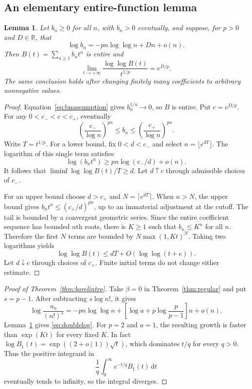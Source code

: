 \documentclass[11pt,a4paper]{article}
\numberwithin{equation}{section}
\newtheorem{lemma}[theorem]{Lemma}
\theoremstyle{definition}
\theoremstyle{remark}
\newcommand{\R}{\mathbb R}
\newcommand{\dd}{\mathrm d}
\begin{document}
\subsection{An elementary entire-function lemma}

\begin{lemma}
\label{lem:entiregrowth}
Let $b_n\ge0$ for all $n$, with $b_n>0$ eventually, and suppose, for $p>0$ and $D\in\R$, that
\begin{equation}
 \log b_n=-p n\log\log n+Dn+o(n).
 \label{eq:bnassumption}
\end{equation}
Then $B(t)=\sum_{n\ge1}b_nt^n$ is entire and
\begin{equation}
 \lim_{t\to+\infty}\frac{\log\log B(t)}{t^{1/p}}=e^{D/p}.
 \label{eq:entiregrowth}
\end{equation}
The same conclusion holds after changing finitely many coefficients to
arbitrary nonnegative values.
\end{lemma}

\begin{proof}
Equation~\eqref{eq:bnassumption} gives $b_n^{1/n}\to0$, so $B$ is entire.
Put $c=e^{D/p}$.  For any $0<c_-<c<c_+$, eventually
\[
 \left(\frac{c_-}{\log n}\right)^{pn}
 \le b_n\le
 \left(\frac{c_+}{\log n}\right)^{pn}.
\]
Write $T=t^{1/p}$.  For a lower bound, fix $0<d<c_-$ and select
$n=\lfloor e^{dT}\rfloor$.  The logarithm of this single term satisfies
\[
 \log(b_nt^n)\ge pn\log(c_-/d)+o(n).
\]
It follows that $\liminf\log\log B(t)/T\ge d$.  Let $d\uparrow c$ through
admissible choices of $c_-$.

For an upper bound choose $d>c_+$ and $N=\lceil e^{dT}\rceil$.
When $n>N$, the upper bound gives
$b_nt^n\le(c_+/d)^{pn}$, up to an immaterial adjustment at the cutoff.
The tail is bounded by a convergent geometric series.  Since the entire
coefficient sequence has bounded $n$th roots, there is $K\ge1$ such that
$b_n\le K^n$ for all $n$.  Therefore the first $N$ terms are bounded by
$N\max(1,Kt)^N$.  Taking two logarithms yields
\[
 \log\log B(t)\le dT+O(\log\log(t+e)).
\]
Let $d\downarrow c$ through choices of $c_+$.  Finite initial terms do not
change either estimate.
\end{proof}

\begin{proof}[Proof of Theorem~\ref{thm:borelintro}]
Take $\beta=0$ in Theorem~\ref{thm:regular} and put $s=p-1$.
After subtracting $s\log n!$, it gives
\[
 \log\frac{u_n}{(n!)^s}
 =-p n\log\log n+
   \left[\log a+p\log\frac p{p-1}\right]n+o(n).
\]
Lemma~\ref{lem:entiregrowth} gives \eqref{eq:doublelog}.
For $p=2$ and $a=1$, the resulting growth is faster than
$\exp(Kt)$ for every fixed $K$.  In fact
$\log B_1(t)=\exp((2+o(1))\sqrt t)$, which dominates $t/q$ for every
$q>0$.  Thus the positive integrand in
\[
 \frac1q\int_0^\infty e^{-t/q}B_1(t)\,\dd t
\]
eventually tends to infinity, so the integral diverges.
\end{proof}
\end{document}
